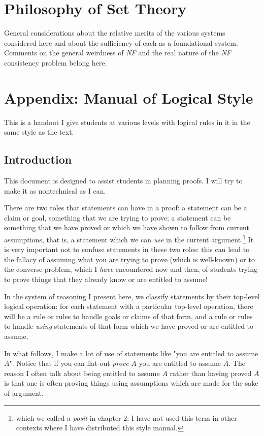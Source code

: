 \documentclass[12pt]{book}
\begin{document}
\chapter{Philosophy of Set Theory}

General considerations about the relative merits of the various
systems considered here and about the sufficiency of each as a
foundational system.  Comments on the general weirdness of {\em NF\/}
and the real nature of the {\em NF\/} consistency problem belong here.

\newpage

\chapter{Appendix:  Manual of Logical Style}

This is a handout I give students at various levels with logical rules in it in the same style as the text.

\section{Introduction}

This document is designed to assist students in planning proofs.  I
will try to make it as nontechnical as I can.

There are two roles that statements can have in a proof: a statement
can be a claim or goal, something that we are trying to prove; a
statement can be something that we have proved or which we have shown
to follow from current assumptions, that is, a statement which we can
{\em use\/} in the current argument.\footnote{which we called a {\em posit\/} in chapter 2:  I have not used this term in other contexts where I have distributed this style manual.}  It is very important not to
confuse statements in these two roles: this can lead to the fallacy of
assuming what you are trying to prove (which is well-known) or to the
converse problem, which I {\em have\/} encountered now and then, of
students trying to prove things that they already know or are entitled
to assume!

In the system of reasoning I present here, we classify statements by
their top-level logical operation: for each statement with a
particular top-level operation, there will be a rule or rules to
handle goals or claims of that form, and a rule or rules to handle
{\em using\/} statements of that form which we have proved or are
entitled to assume.

In what follows, I make a lot of use of statements like "you are entitled to assume $A$".  Notice that if you can flat-out {\em prove\/} $A$ you are entitled to assume $A$.  The reason I often talk about being entitled to assume $A$ rather than having proved $A$ is that one is often proving things using assumptions which are made for the sake of argument.
\end{document}
